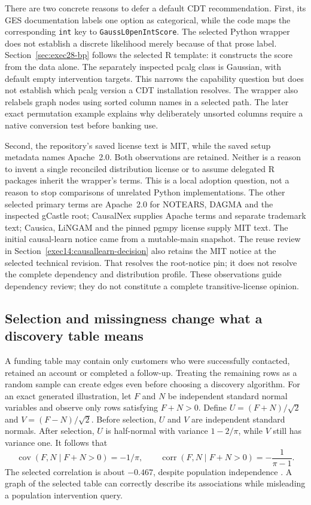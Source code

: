 There are two concrete reasons to defer a default CDT recommendation. First,
its GES documentation labels one option as categorical, while the code maps
the corresponding \texttt{int} key to \texttt{GaussL0penIntScore}. The selected
Python wrapper does not establish a discrete likelihood merely because of
that prose label. Section~\ref{sec:exec28-bp} follows the selected R template:
it constructs the score from the data alone. The separately inspected pcalg
class is Gaussian, with default empty intervention targets. This narrows
the capability question but does not establish which pcalg version a CDT
installation resolves. The wrapper also relabels graph nodes using sorted
column names in a selected path. The later exact permutation example explains
why deliberately unsorted columns require a native conversion test before
banking use. \citep{exec28_bp_cdt}

Second, the repository's saved license text is MIT, while the saved setup
metadata names Apache~2.0. Both observations are retained. Neither is a reason
to invent a single reconciled distribution license or to assume delegated
R packages inherit the wrapper's terms. This is a local adoption question,
not a reason to stop comparisons of unrelated Python implementations. The
other selected primary terms are Apache~2.0 for NOTEARS, DAGMA and the inspected
gCastle root; CausalNex supplies Apache terms and separate trademark text;
Causica, LiNGAM and the pinned pgmpy license supply MIT text. The initial
causal-learn notice came from a mutable-main snapshot. The reuse review in
Section~\ref{exec14:causallearn-decision} also retains the MIT notice at the
selected technical revision. That resolves the root-notice pin; it does not
resolve the complete dependency and distribution profile. These observations
guide dependency review; they do not constitute a complete transitive-license
opinion. \citep{exec14_causallearn_reuse}

\subsection{Selection and missingness change what a discovery table means}

A funding table may contain only customers who were successfully contacted,
retained an account or completed a follow-up. Treating the remaining rows as a
random sample can create edges even before choosing a discovery algorithm.
For an exact generated illustration, let \(F\) and \(N\) be independent
standard normal variables and observe only rows satisfying \(F+N>0\). Define
\(U=(F+N)/\sqrt2\) and \(V=(F-N)/\sqrt2\). Before selection, \(U\) and \(V\)
are independent standard normals. After selection, \(U\) is half-normal with
variance \(1-2/\pi\), while \(V\) still has variance one. It follows that
\begin{equation}
 \operatorname{cov}(F,N\mid F+N>0)=-1/\pi,\qquad
 \operatorname{corr}(F,N\mid F+N>0)=-\frac1{\pi-1}.
\end{equation}
The selected correlation is about \(-0.467\), despite population independence
\citep{exec13_pydisc_examples}. A graph of the selected table can correctly
describe its associations while misleading a population intervention query.


